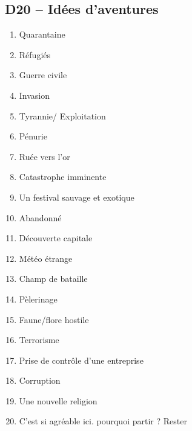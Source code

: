 \documentclass{article}
\begin{document}
\begin{multicols}{2}
	\section*{D20 -- Idées d’aventures}
	\begin{enumerate}
		\item Quarantaine
		\item Réfugiés
		\item Guerre civile
		\item Invasion
		\item Tyrannie/ Exploitation
		\item Pénurie
		\item Ruée vers l'or
		\item Catastrophe imminente
		\item Un festival sauvage et exotique
		\item Abandonné
		\item Découverte capitale
		\item Météo étrange
		\item Champ de bataille
		\item Pèlerinage
		\item Faune/flore hostile
		\item Terrorisme
		\item Prise de contrôle d'une entreprise 
		\item Corruption
		\item Une nouvelle religion
		\item C'est si agréable ici. pourquoi partir ? Rester
	\end{enumerate}
\end{multicols}
\clearpage
\end{document}
